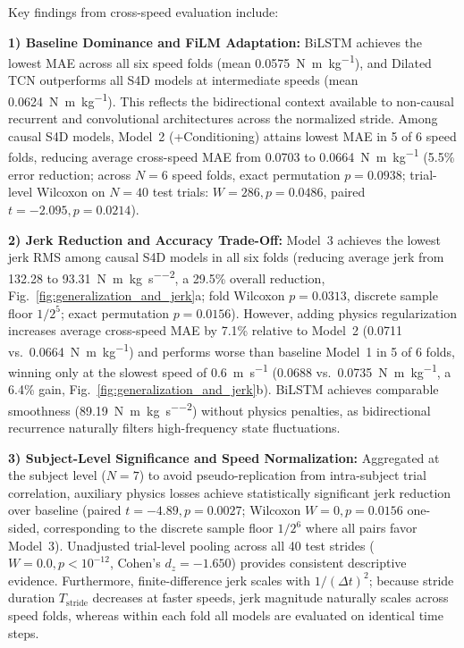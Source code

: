 \documentclass[journal]{IEEEtran}
\newcommand{\Nmskg}{\si{\newton\metre\per\kilogram}}
\newcommand{\Nmskgsq}{\si{\newton\metre\per\kilogram\per\second\squared}}
\begin{document}
Key findings from cross-speed evaluation include:

\noindent\textbf{1) Baseline Dominance and FiLM Adaptation:} BiLSTM achieves the lowest MAE across all six speed folds (mean 0.0575~\Nmskg{}), and Dilated TCN outperforms all S4D models at intermediate speeds (mean 0.0624~\Nmskg{}). This reflects the bidirectional context available to non-causal recurrent and convolutional architectures across the normalized stride. Among causal S4D models, Model~2 (+Conditioning) attains lowest MAE in 5 of 6 speed folds, reducing average cross-speed MAE from 0.0703 to 0.0664~\Nmskg{} (5.5\% error reduction; across $N=6$ speed folds, exact permutation $p = 0.0938$; trial-level Wilcoxon on $N=40$ test trials: $W=286, p = 0.0486$, paired $t = -2.095, p = 0.0214$).

\noindent\textbf{2) Jerk Reduction and Accuracy Trade-Off:} Model~3 achieves the lowest jerk RMS among causal S4D models in all six folds (reducing average jerk from 132.28 to 93.31~\Nmskgsq{}, a 29.5\% overall reduction, Fig.~\ref{fig:generalization_and_jerk}a; fold Wilcoxon $p = 0.0313$, discrete sample floor $1/2^5$; exact permutation $p = 0.0156$). However, adding physics regularization increases average cross-speed MAE by 7.1\% relative to Model~2 (0.0711 vs.\ 0.0664~\Nmskg{}) and performs worse than baseline Model~1 in 5 of 6 folds, winning only at the slowest speed of 0.6~\si{\metre\per\second} (0.0688 vs.\ 0.0735~\Nmskg{}, a 6.4\% gain, Fig.~\ref{fig:generalization_and_jerk}b). BiLSTM achieves comparable smoothness (89.19~\Nmskgsq{}) without physics penalties, as bidirectional recurrence naturally filters high-frequency state fluctuations.

\noindent\textbf{3) Subject-Level Significance and Speed Normalization:} Aggregated at the subject level ($N=7$) to avoid pseudo-replication from intra-subject trial correlation, auxiliary physics losses achieve statistically significant jerk reduction over baseline (paired $t = -4.89, p = 0.0027$; Wilcoxon $W = 0, p = 0.0156$ one-sided, corresponding to the discrete sample floor $1/2^6$ where all pairs favor Model~3). Unadjusted trial-level pooling across all 40 test strides ($W = 0.0, p < 10^{-12}$, Cohen's $d_z = -1.650$) provides consistent descriptive evidence. Furthermore, finite-difference jerk scales with $1/(\Delta t)^2$; because stride duration $T_{\mathrm{stride}}$ decreases at faster speeds, jerk magnitude naturally scales across speed folds, whereas within each fold all models are evaluated on identical time steps.
\end{document}
